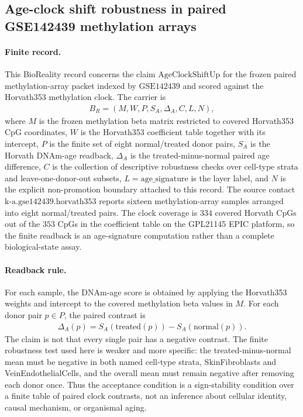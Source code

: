 \subsection{Age-clock shift robustness in paired GSE142439 methylation arrays}\label{subsec:age-clock-shift-gse142439-cross-cell-type-robustness}

\paragraph{Finite record.}
This BioReality record concerns the claim $\mathrm{AgeClockShiftUp}$ for the frozen paired methylation-array packet indexed by $\mathrm{GSE142439}$ and scored against the Horvath353 methylation clock.  The carrier is
$$
\begin{aligned}
B_R=(M,W,P,S_A,\Delta_A,C,L,N),
\end{aligned}
$$
where $M$ is the frozen methylation beta matrix restricted to covered Horvath353 CpG coordinates, $W$ is the Horvath353 coefficient table together with its intercept, $P$ is the finite set of eight normal/treated donor pairs, $S_A$ is the Horvath DNAm-age readback, $\Delta_A$ is the treated-minus-normal paired age difference, $C$ is the collection of descriptive robustness checks over cell-type strata and leave-one-donor-out subsets, $L=\mathrm{age\_signature}$ is the layer label, and $N$ is the explicit non-promotion boundary attached to this record.  The source contact $\mathrm{k\mbox{-}a.gse142439.horvath353}$ reports sixteen methylation-array samples arranged into eight normal/treated pairs.  The clock coverage is $334$ covered Horvath CpGs out of the $353$ CpGs in the coefficient table on the GPL21145 EPIC platform, so the finite readback is an age-signature computation rather than a complete biological-state assay.

\paragraph{Readback rule.}
For each sample, the DNAm-age score is obtained by applying the Horvath353 weights and intercept to the covered methylation beta values in $M$.  For each donor pair $p\in P$, the paired contrast is
$$
\begin{aligned}
\Delta_A(p)=S_A(\mathrm{treated}(p))-S_A(\mathrm{normal}(p)).
\end{aligned}
$$
The claim is not that every single pair has a negative contrast.  The finite robustness test used here is weaker and more specific: the treated-minus-normal mean must be negative in both named cell-type strata, SkinFibroblasts and VeinEndothelialCells, and the overall mean must remain negative after removing each donor once.  Thus the acceptance condition is a sign-stability condition over a finite table of paired clock contrasts, not an inference about cellular identity, causal mechanism, or organismal aging.

